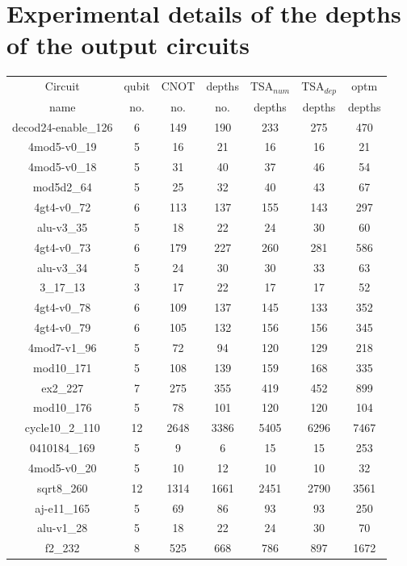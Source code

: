 \documentclass[runningheads]{llncs}
\begin{document}
\section{Experimental details of the depths of the output circuits}
					\begin{table}[H]
						\begin{center}  
						\begin{tabular}{|c|c|c|c|c|c|c|}
						\hline
						Circuit &  qubit  & CNOT &depths &TSA$_{num}$& TSA$_{dep}$  & optm 	  	\\
						 name	&   no. 	&	no. & no. & depths&  depths &  depths 	\\
						\hline
						decod24-enable\_126 & 6 & 149 & 190 & 233 & 275 & 470 \\
4mod5-v0\_19 & 5 & 16 & 21 & 16 & 16 & 21 \\
4mod5-v0\_18 & 5 & 31 & 40 & 37 & 46 & 54 \\
mod5d2\_64 & 5 & 25 & 32 & 40 & 43 & 67 \\
4gt4-v0\_72 & 6 & 113 & 137 & 155 & 143 & 297 \\
alu-v3\_35 & 5 & 18 & 22 & 24 & 30 & 60 \\
4gt4-v0\_73 & 6 & 179 & 227 & 260 & 281 & 586 \\
alu-v3\_34 & 5 & 24 & 30 & 30 & 33 & 63 \\
3\_17\_13 & 3 & 17 & 22 & 17 & 17 & 52 \\
4gt4-v0\_78 & 6 & 109 & 137 & 145 & 133 & 352 \\
4gt4-v0\_79 & 6 & 105 & 132 & 156 & 156 & 345 \\
4mod7-v1\_96 & 5 & 72 & 94 & 120 & 129 & 218 \\
mod10\_171 & 5 & 108 & 139 & 159 & 168 & 335 \\
ex2\_227 & 7 & 275 & 355 & 419 & 452 & 899 \\
mod10\_176 & 5 & 78 & 101 & 120 & 120 & 104 \\
cycle10\_2\_110 & 12 & 2648 & 3386 & 5405 & 6296 & 7467 \\
0410184\_169 & 5 & 9 & 6 & 15 & 15 & 253 \\
4mod5-v0\_20 & 5 & 10 & 12 & 10 & 10 & 32 \\
sqrt8\_260 & 12 & 1314 & 1661 & 2451 & 2790 & 3561 \\
aj-e11\_165 & 5 & 69 & 86 & 93 & 93 & 250 \\
alu-v1\_28 & 5 & 18 & 22 & 24 & 30 & 70 \\
f2\_232 & 8 & 525 & 668 & 786 & 897 & 1672 \\

\end{tabular}
\end{center}
\end{table}
\end{document}
